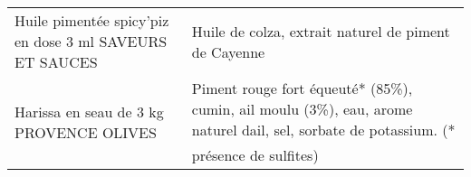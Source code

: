 \begin{longtable}{p{5cm}p{10cm}}
                                                  Huile pimentée spicy'piz en dose 3 ml SAVEURS ET SAUCES &                                                                                                                                                                                                                                                                                                                                                                                                                                                                                                                                                                                                                                                                                                                                                                                                                                                                                                                                                                                     Huile de colza, extrait naturel de piment de Cayenne \\
                                                                  Harissa en seau de 3 kg PROVENCE OLIVES &                                                                                                                                                                                                                                                                                                                                                                                                                                                                                                                                                                                                                                                                                                                                                                                                                                                                                                   Piment rouge fort équeuté* (85\%), cumin, ail moulu (3\%), eau, arome naturel dail, sel, sorbate de potassium. (* présence de sulfites) \\

\end{longtable}
